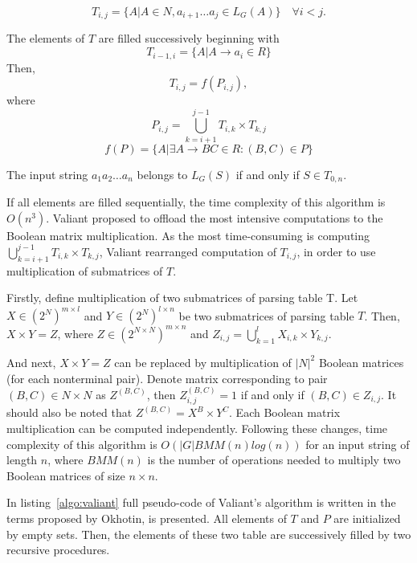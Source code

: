\begin{equation}
T_{i, j} =  \{ A | A \in N, a_{i + 1} \dots a_{j} \in L_{G}(A)\} \quad \forall i < j.
\end{equation}

The elements of $T$ are filled successively beginning with
\begin{equation}
T_{i - 1, i} = \{ A | A \rightarrow a_{i} \in R\}
\end{equation}
Then, 
\begin{equation}
T_{i, j} = f(P_{i, j}),
\end{equation}
where
\begin{equation}
P_{i, j} = \bigcup\limits_{k = i + 1}^{j - 1} T_{i,k} \times T_{k, j}
\end{equation}
\begin{equation}
f(P) = \{A | \exists A \rightarrow BC \in R : (B, C) \in P\} 
\end{equation}

The input string $a_{1}a_{2} \dots a_{n}$ belongs to $L_{G}(S)$ if and only if $S \in T_{0, n}$.

If all elements are filled sequentially, the time complexity of this algorithm is $O(n^3)$. Valiant proposed to offload the most intensive computations to the Boolean matrix multiplication. As the most time-consuming is computing $\bigcup\limits_{k = i + 1}^{j - 1} T_{i, k} \times T_{k, j}$, Valiant rearranged computation of $T_{i, j}$, in order to use multiplication of submatrices of $T$.

Firstly, define multiplication of two submatrices of parsing table T. Let $X \in (2^N)^{m \times l}$ and $Y \in (2^N)^{l \times n}$ be two submatrices of parsing table $T$. Then, $X \times Y = Z$, where $Z \in (2^{N \times N})^{m \times n}$ and $Z_{i, j} = \bigcup\limits_{k = 1}^{l} X_{i, k} \times Y_{k, j}$.

And next, $X \times Y = Z$  can be replaced by multiplication of $|N|^2$ Boolean matrices (for each nonterminal pair). Denote matrix corresponding to pair $(B, C) \in N \times N$ as $Z^{(B, C)}$, then $Z_{i, j}^{(B, C)} = 1$ if and only if $(B, C) \in Z_{i, j}$. It should also be noted that $Z^{(B, C)} = X^{B} \times Y^{C}$. Each Boolean matrix multiplication can be computed independently. Following these changes, time complexity of this algorithm is $O(|G|BMM(n)log(n))$ for an input string of length $n$, where $BMM(n)$ is the number of operations needed to multiply two Boolean matrices of size $n \times n$.

In listing~\ref{algo:valiant} full pseudo-code of Valiant's algorithm is written in the terms proposed by Okhotin, is presented. All elements of $T$ and $P$ are initialized by empty sets. Then, the elements of these two table are successively filled by two recursive procedures. 

